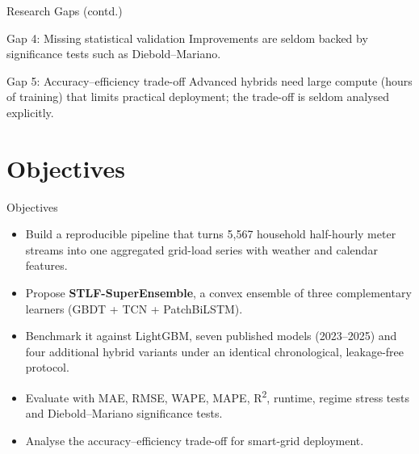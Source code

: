 \documentclass[aspectratio=169]{beamer}
\begin{document}
\begin{frame}{Research Gaps (contd.)}
  \begin{block}{Gap 4: Missing statistical validation}
    Improvements are seldom backed by significance tests such as Diebold--Mariano.
  \end{block}
  \begin{block}{Gap 5: Accuracy--efficiency trade-off}
    Advanced hybrids need large compute (hours of training) that limits practical deployment; the trade-off is seldom analysed explicitly.
  \end{block}
\end{frame}

\section{Objectives}
\begin{frame}{Objectives}
  \begin{itemize}
    \item Build a reproducible pipeline that turns 5,567 household half-hourly meter streams into one aggregated grid-load series with weather and calendar features.
    \item Propose \textbf{STLF-SuperEnsemble}, a convex ensemble of three complementary learners (GBDT + TCN + PatchBiLSTM).
    \item Benchmark it against LightGBM, seven published models (2023--2025) and four additional hybrid variants under an identical chronological, leakage-free protocol.
    \item Evaluate with MAE, RMSE, WAPE, MAPE, R\textsuperscript{2}, runtime, regime stress tests and Diebold--Mariano significance tests.
    \item Analyse the accuracy--efficiency trade-off for smart-grid deployment.
  \end{itemize}
\end{frame}

\end{document}
